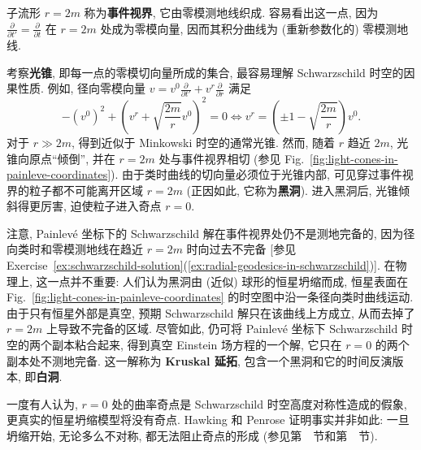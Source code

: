 子流形 $r=2m$ 称为\textbf{事件视界}, 它由零模测地线织成. 容易看出这一点, 因为 $\frac{\partial}{\partial t'}=\frac{\partial}{\partial t}$ 在 $r=2m$ 处成为零模向量, 因而其积分曲线为 (重新参数化的) 零模测地线.

考察\textbf{光锥}, 即每一点的零模切向量所成的集合, 最容易理解 Schwarzschild 时空的因果性质. 例如, 径向零模向量 $v=v^0\frac{\partial}{\partial t'}+v^r\frac{\partial}{\partial r}$ 满足
\[
  -(v^0)^2+\left(v^r+\sqrt{\frac{2m}{r}}v^0\right)^2=0
    \iff v^r=\left(\pm1-\sqrt{\frac{2m}{r}}\right)v^0.
\]
对于 $r\gg2m$, 得到近似于 Minkowski 时空的通常光锥. 然而, 随着 $r$ 趋近 $2m$, 光锥向原点\textquotedblleft 倾倒\textquotedblright, 并在 $r=2m$ 处与事件视界相切 (参见 Fig.~\ref{fig:light-cones-in-painleve-coordinates}). 由于类时曲线的切向量必须位于光锥内部, 可见穿过事件视界的粒子都不可能离开区域 $r=2m$ (正因如此, 它称为\label{idx:schwarzschild-black-hole}\textbf{黑洞}). 进入黑洞后, 光锥倾斜得更厉害, 迫使粒子进入奇点 $r=0$.

注意, Painlevé 坐标下的 Schwarzschild 解在事件视界处仍不是测地完备的, 因为径向类时和零模测地线在趋近 $r=2m$ 时向过去不完备 [参见 Exercise~\ref{ex:schwarzschild-solution}(\ref{ex:radial-geodesics-in-schwarzschild})]. 在物理上, 这一点并不重要: 人们认为黑洞由 (近似) 球形的恒星坍缩而成, 恒星表面在 Fig.~\ref{fig:light-cones-in-painleve-coordinates} 的时空图中沿一条径向类时曲线运动. 由于只有恒星外部是真空, 预期 Schwarzschild 解只在该曲线上方成立, 从而去掉了 $r=2m$ 上导致不完备的区域. 尽管如此, 仍可将 Painlevé 坐标下 Schwarzschild 时空的两个副本粘合起来, 得到真空 Einstein 场方程的一个解, 它只在 $r=0$ 的两个副本处不测地完备. 这一解称为 \textbf{Kruskal 延拓}, 包含一个黑洞和它的时间反演版本, 即\textbf{白洞}.

一度有人认为, $r=0$ 处的曲率奇点是 Schwarzschild 时空高度对称性造成的假象, 更真实的恒星坍缩模型将没有奇点. Hawking 和 Penrose 证明事实并非如此: 一旦坍缩开始, 无论多么不对称, 都无法阻止奇点的形成 (参见第~~节和第~~节).

